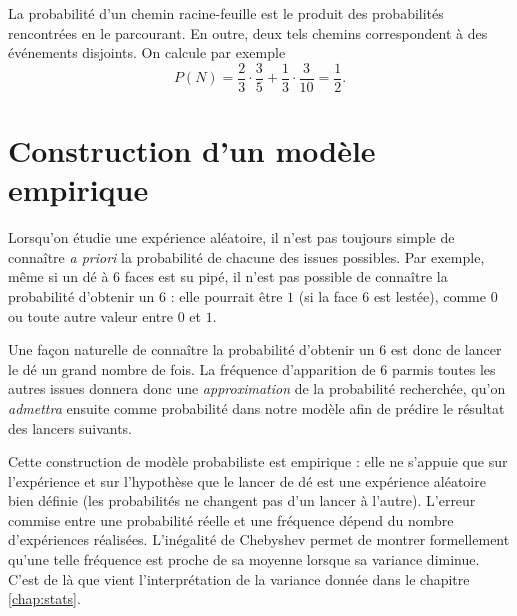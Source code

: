 {\begin{center}
	\end{center}
	La probabilité d'un chemin racine-feuille est le produit des probabilités rencontrées en le parcourant.
	En outre, deux tels chemins correspondent à des événements disjoints.
	On calcule par exemple
		\[ P(N) = \dfrac23 \cdot \dfrac35 + \dfrac13 \cdot \dfrac3{10} = \dfrac12. \]
}{}


\section{Construction d'un modèle empirique}

Lorsqu'on étudie une expérience aléatoire, il n'est pas toujours simple de connaître \emph{a priori} la probabilité de chacune des issues possibles.
Par exemple, même si un dé à $6$ faces est su pipé, il n'est pas possible de connaître la probabilité d'obtenir un $6$ : elle pourrait être $1$ (si la face $6$ est lestée), comme $0$ ou toute autre valeur entre $0$ et $1$.

Une façon naturelle de connaître la probabilité d'obtenir un $6$ est donc de lancer le dé un grand nombre de fois.
La fréquence d'apparition de $6$ parmis toutes les autres issues donnera donc une \emph{approximation} de la probabilité recherchée, qu'on \emph{admettra} ensuite comme probabilité dans notre modèle afin de prédire le résultat des lancers suivants.

Cette construction de modèle probabiliste est empirique : elle ne s'appuie que sur l'expérience et sur l'hypothèse que le lancer de dé est une expérience aléatoire bien définie (les probabilités ne changent pas d'un lancer à l'autre).
L'erreur commise entre une probabilité réelle et une fréquence dépend du nombre d'expériences réalisées.
L'inégalité de Chebyshev permet de montrer formellement qu'une telle fréquence est proche de sa moyenne lorsque sa variance diminue.
C'est de là que vient l'interprétation de la variance donnée dans le chapitre \ref{chap:stats}.

